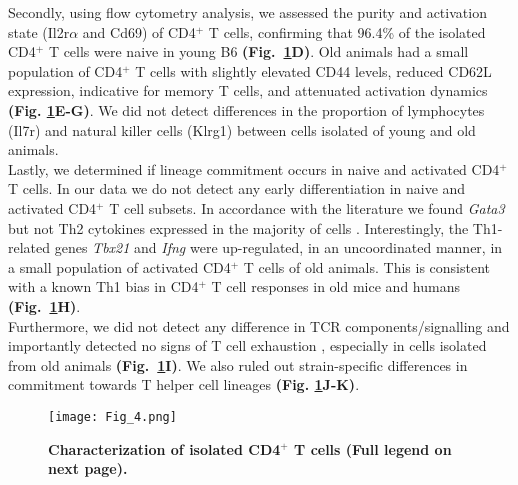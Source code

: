 Secondly, using flow cytometry analysis, we assessed the purity and activation state (Il2r$\alpha$ and Cd69) of CD4$^+$ T cells, confirming that 96.4\% of the isolated CD4$^+$ T cells were naive in young B6 \textbf{(Fig.~\ref{fig1:characterization}D)}. Old animals had a small population of CD4$^+$ T cells with slightly elevated CD44 levels, reduced CD62L expression, indicative for memory T cells, and attenuated activation dynamics \textbf{(Fig. \ref{fig1:characterization}E-G)}. We did not detect differences in the proportion of lymphocytes (Il7r) and natural killer cells (Klrg1) between cells isolated of young and old animals. \\

Lastly, we determined if lineage commitment occurs in naive and activated CD4$^+$ T cells. In our data we do not detect any early differentiation in naive and activated CD4$^+$ T cell subsets. In accordance with the literature we found \textit{Gata3} but not Th2 cytokines expressed in the majority of cells  \citep{Ho2009}. Interestingly, the Th1-related genes \textit{Tbx21} and \textit{Ifng} were up-regulated, in an uncoordinated manner, in a small population of activated CD4$^+$ T cells of old animals. This is consistent with a known Th1 bias in CD4$^+$ T cell responses in old mice \citep{Zhang2014} and humans \citep{Sakata-Kaneko2000} \textbf{(Fig.~\ref{fig1:characterization}H)}. \\

Furthermore, we did not detect any difference in TCR components/signalling and importantly detected no signs of T cell exhaustion \citep{Wherry2011}, especially in cells isolated from old animals \textbf{(Fig.~\ref{fig1:characterization}I)}. We also ruled out strain-specific differences in commitment towards T helper cell lineages \textbf{(Fig. \ref{fig1:characterization}J-K)}. 

\newpage

\begin{figure}[!hb]
\centering
\texttt{[image: Fig\_4.png]}
\caption[Characterization of isolated CD4$^+$ T cells]{\textbf{Characterization of isolated CD4$^+$ T cells (Full legend on next page).}}
\label{fig1:characterization}
\end{figure}

